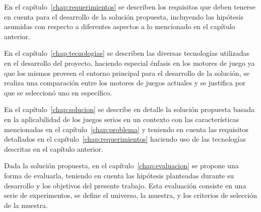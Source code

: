 


En el capítulo~\ref{chap:requerimientos} se describen los requisitos que deben 
tenerse en cuenta para el desarrollo de la solución propuesta, incluyendo las hipótesis asumidas
con respecto a diferentes aspectos a lo mencionado en el capítulo anterior.


En el capítulo~\ref{chap:tecnologias} se describen las diversas tecnologías utilizadas 
en el desarrollo del proyecto, haciendo especial énfasis en los motores de juego ya que 
los mismos proveen el entorno principal para el desarrollo de la solución, se realiza 
una comparación entre los motores de juegos actuales y se justifica por que se seleccionó 
uno en específico.





En el capítulo~\ref{chap:solucion} se describe en detalle la solución propuesta basada en 
la aplicabilidad de los juegos serios en un contexto con las características mencionadas en 
el capítulo~\ref{chap:problema} y teniendo en cuenta las requisitos detallados en el 
capítulo~\ref{chap:requerimientos} haciendo uso de las tecnologías descritas en el capítulo 
anterior. 


Dada la solución propuesta, en el capítulo~\ref{chap:evaluacion} se propone una
forma de evaluarla, teniendo en cuenta las hipótesis planteadas durante su desarrollo  
y los objetivos del presente trabajo. Esta evaluación consiste en una serie de experimentos, 
se define el universo, la muestra, y los criterios de selección de la muestra.

